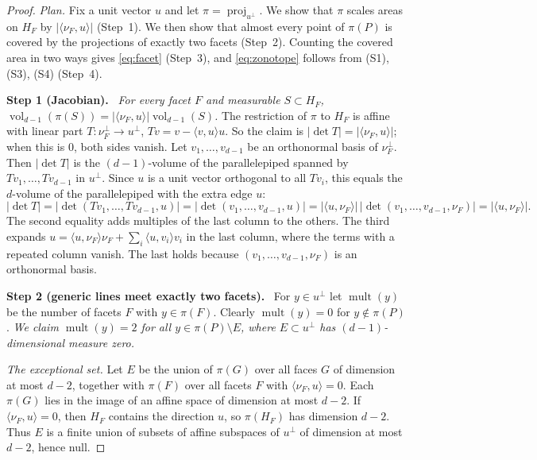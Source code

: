 \documentclass[11pt]{article}
\DeclareMathOperator{\vol}{vol}
\DeclareMathOperator{\proj}{proj}
\DeclareMathOperator{\mult}{mult}
\newcommand{\step}[1]{\par\smallskip\noindent\textbf{#1}\ }
\begin{document}
\begin{proof}
\emph{Plan.} Fix a unit vector \(u\) and let \(\pi=\proj_{u^\perp}\). We
show that \(\pi\) scales areas on \(H_F\) by \(|\langle\nu_F,u\rangle|\)
(Step~1). We then show that almost every point of \(\pi(P)\) is covered by
the projections of exactly two facets (Step~2). Counting the covered area
in two ways gives \eqref{eq:facet} (Step~3), and
\eqref{eq:zonotope} follows from (S1), (S3), (S4) (Step~4).

\step{Step 1 (Jacobian).} \emph{For every facet \(F\) and measurable
\(S\subset H_F\),
\(\vol_{d-1}(\pi(S))=|\langle\nu_F,u\rangle|\vol_{d-1}(S)\).}
The restriction of \(\pi\) to \(H_F\) is affine with linear part
\(T\colon\nu_F^\perp\to u^\perp\), \(Tv=v-\langle v,u\rangle u\). So the
claim is \(|\det T|=|\langle\nu_F,u\rangle|\); when this is \(0\), both
sides vanish. Let \(v_1,\dots,v_{d-1}\) be an orthonormal basis of
\(\nu_F^\perp\). Then \(|\det T|\) is the \((d-1)\)-volume of the
parallelepiped spanned by \(Tv_1,\dots,Tv_{d-1}\) in \(u^\perp\). Since
\(u\) is a unit vector orthogonal to all \(Tv_i\), this equals the
\(d\)-volume of the parallelepiped with the extra edge \(u\):
\[
 |\det T|=|\det(Tv_1,\dots,Tv_{d-1},u)|
 =|\det(v_1,\dots,v_{d-1},u)|
 =|\langle u,\nu_F\rangle|\,|\det(v_1,\dots,v_{d-1},\nu_F)|
 =|\langle u,\nu_F\rangle|.
\]
The second equality adds multiples of the last column to the others. The
third expands
\(u=\langle u,\nu_F\rangle\nu_F+\sum_i\langle u,v_i\rangle v_i\) in the
last column, where the terms with a repeated column vanish. The last holds
because \((v_1,\dots,v_{d-1},\nu_F)\) is an orthonormal basis.

\step{Step 2 (generic lines meet exactly two facets).} For
\(y\in u^\perp\) let \(\mult(y)\) be the number of facets \(F\) with
\(y\in\pi(F)\). Clearly \(\mult(y)=0\) for \(y\notin\pi(P)\). \emph{We
claim \(\mult(y)=2\) for all \(y\in\pi(P)\setminus E\), where
\(E\subset u^\perp\) has \((d-1)\)-dimensional measure zero.}

\emph{The exceptional set.} Let \(E\) be the union of \(\pi(G)\) over all
faces \(G\) of dimension at most \(d-2\), together with \(\pi(F)\) over all
facets \(F\) with \(\langle\nu_F,u\rangle=0\). Each \(\pi(G)\) lies in the
image of an affine space of dimension at most \(d-2\). If
\(\langle\nu_F,u\rangle=0\), then \(H_F\) contains the direction \(u\), so
\(\pi(H_F)\) has dimension \(d-2\). Thus \(E\) is a finite union of subsets
of affine subspaces of \(u^\perp\) of dimension at most \(d-2\), hence
null.


\end{proof}
\end{document}
